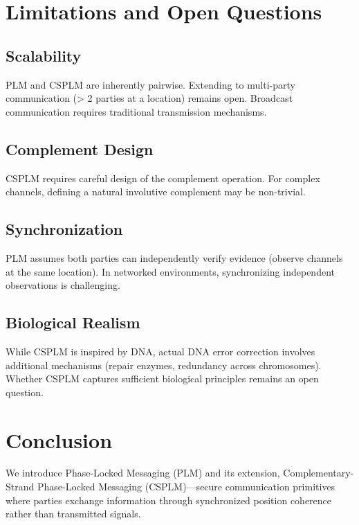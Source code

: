\documentclass[11pt,a4paper]{article}
\theoremstyle{definition}
\begin{document}
\section{Limitations and Open Questions}

\subsection{Scalability}

PLM and CSPLM are inherently pairwise. Extending to multi-party communication (> 2 parties at a location) remains open. Broadcast communication requires traditional transmission mechanisms.

\subsection{Complement Design}

CSPLM requires careful design of the complement operation. For complex channels, defining a natural involutive complement may be non-trivial.

\subsection{Synchronization}

PLM assumes both parties can independently verify evidence (observe channels at the same location). In networked environments, synchronizing independent observations is challenging.

\subsection{Biological Realism}

While CSPLM is inspired by DNA, actual DNA error correction involves additional mechanisms (repair enzymes, redundancy across chromosomes). Whether CSPLM captures sufficient biological principles remains an open question.

\section{Conclusion}
\label{sec:conclusion}

We introduce Phase-Locked Messaging (PLM) and its extension, Complementary-Strand Phase-Locked Messaging (CSPLM)—secure communication primitives where parties exchange information through synchronized position coherence rather than transmitted signals.
\end{document}
